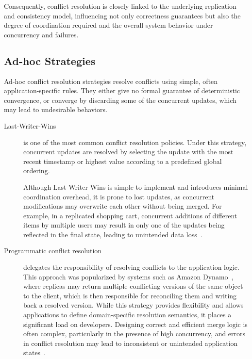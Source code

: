 Consequently, conflict resolution is closely linked to the underlying replication and consistency model, influencing not only correctness guarantees but also the degree of coordination required and the overall system behavior under concurrency and failures.

\subsection{Ad-hoc Strategies}
\label{sub:strategies}

Ad-hoc conflict resolution strategies resolve conflicts using simple, often application-specific rules. They either give no formal guarantee of deterministic convergence, or converge by discarding some of the concurrent updates, which may lead to undesirable behaviors.

\begin{description}
    \item[Last-Writer-Wins] is one of the most common conflict resolution policies. Under this strategy, concurrent updates are resolved by selecting the update with the most recent timestamp or highest value according to a predefined global ordering.

          Although Last-Writer-Wins is simple to implement and introduces minimal coordination overhead, it is prone to lost updates, as concurrent modifications may overwrite each other without being merged. For example, in a replicated shopping cart, concurrent additions of different items by multiple users may result in only one of the updates being reflected in the final state, leading to unintended data loss~\cite{shapiro2011comprehensive}.
    \item[Programmatic conflict resolution] delegates the responsibility of resolving conflicts to the application logic. This approach was popularized by systems such as Amazon Dynamo~\cite{dynamo}, where replicas may return multiple conflicting versions of the same object to the client, which is then responsible for reconciling them and writing back a resolved version. While this strategy provides flexibility and allows applications to define domain-specific resolution semantics, it places a significant load on developers. Designing correct and efficient merge logic is often complex, particularly in the presence of high concurrency, and errors in conflict resolution may lead to inconsistent or unintended application states~\cite{kohler2019localfirst}.
\end{description}

